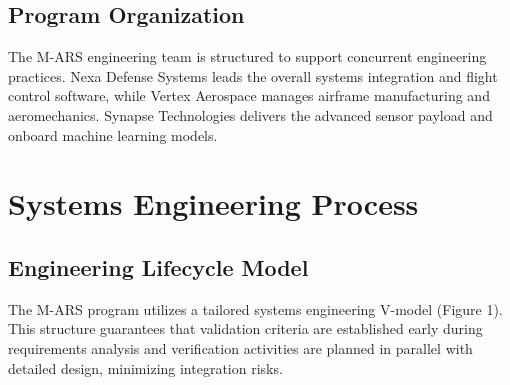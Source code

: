 \documentclass[10pt,letterpaper]{article}
\begin{document}
\subsection{Program Organization}
The M-ARS engineering team is structured to support concurrent engineering practices. Nexa Defense Systems leads the overall systems integration and flight control software, while Vertex Aerospace manages airframe manufacturing and aeromechanics. Synapse Technologies delivers the advanced sensor payload and onboard machine learning models.

\section{Systems Engineering Process}

\subsection{Engineering Lifecycle Model}
The M-ARS program utilizes a tailored systems engineering V-model (Figure 1). This structure guarantees that validation criteria are established early during requirements analysis and verification activities are planned in parallel with detailed design, minimizing integration risks.
\end{document}
